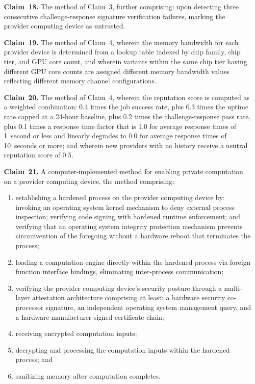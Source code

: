 \documentclass[11pt,letterpaper]{article}
\begin{document}
\textbf{Claim~18.} The method of Claim~3, further comprising: upon detecting three consecutive challenge-response signature verification failures, marking the provider computing device as untrusted.

\textbf{Claim~19.} The method of Claim~4, wherein the memory bandwidth for each provider device is determined from a lookup table indexed by chip family, chip tier, and GPU core count, and wherein variants within the same chip tier having different GPU core counts are assigned different memory bandwidth values reflecting different memory channel configurations.

\textbf{Claim~20.} The method of Claim~4, wherein the reputation score is computed as a weighted combination: 0.4 times the job success rate, plus 0.3 times the uptime rate capped at a 24-hour baseline, plus 0.2 times the challenge-response pass rate, plus 0.1 times a response time factor that is 1.0 for average response times of 1~second or less and linearly degrades to 0.0 for average response times of 10~seconds or more; and wherein new providers with no history receive a neutral reputation score of 0.5.

\textbf{Claim~21.} A computer-implemented method for enabling private computation on a provider computing device, the method comprising:

\begin{enumerate}[label=(\alph*),nosep]
\item establishing a hardened process on the provider computing device by: invoking an operating system kernel mechanism to deny external process inspection; verifying code signing with hardened runtime enforcement; and verifying that an operating system integrity protection mechanism prevents circumvention of the foregoing without a hardware reboot that terminates the process;
\item loading a computation engine directly within the hardened process via foreign function interface bindings, eliminating inter-process communication;
\item verifying the provider computing device's security posture through a multi-layer attestation architecture comprising at least: a hardware security co-processor signature, an independent operating system management query, and a hardware manufacturer-signed certificate chain;
\item receiving encrypted computation inputs;
\item decrypting and processing the computation inputs within the hardened process; and
\item sanitizing memory after computation completes.
\end{enumerate}
\end{document}
